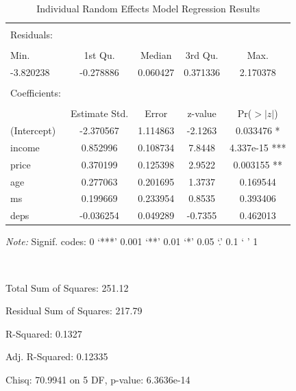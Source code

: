 \documentclass[12pt]{article}
\begin{document}
\begin{table}[!htbp] \centering 
\begin{threeparttable}
  \caption{Individual Random Effects Model Regression Results} 
  \label{} 
\begin{tabular}{@{\extracolsep{5pt}}lcccc} 
 \toprule
\midrule
\\
Residuals: \\
\hline \\[-1.8ex]
     Min.  & 1st Qu. &   Median &  3rd Qu.   &   Max. \\
-3.820238 & -0.278886 &  0.060427 &  0.371336 &  2.170378  \\
 \\
Coefficients:  \\
\hline \\[-1.8ex]
    &         Estimate Std. & Error & z-value & Pr($>|z|$)    \\ 
(Intercept) & -2.370567   & 1.114863 & -2.1263 &  0.033476 *   \\
income   &    0.852996  &  0.108734  & 7.8448 & 4.337e-15 *** \\
price    &    0.370199  &  0.125398  & 2.9522  & 0.003155 **  \\
age     &     0.277063  &  0.201695  & 1.3737  & 0.169544     \\
ms      &     0.199669  &  0.233954 &  0.8535  & 0.393406     \\
deps   &     -0.036254 & 0.049289 & -0.7355 & 0.462013   \\
\bottomrule
 \end{tabular}
 \begin{tablenotes}    
\small
\item \textit{Note:} Signif. codes:  0 ‘***’ 0.001 ‘**’ 0.01 ‘*’ 0.05 ‘.’ 0.1 ‘ ’ 1
\item \ 
\item Total Sum of Squares:    251.12
\item Residual Sum of Squares: 217.79
\item R-Squared:      0.1327
\item Adj. R-Squared: 0.12335
\item Chisq: 70.9941 on 5 DF, p-value: 6.3636e-14
\end{tablenotes}
  \end{threeparttable}
\end{table} 
\newpage
\end{document}
